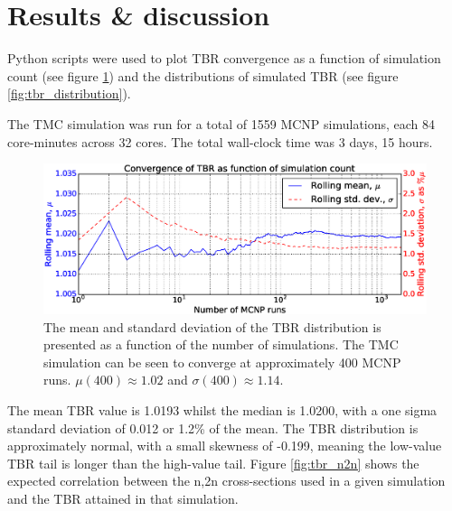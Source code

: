 \section{Results \& discussion}
Python scripts were used to plot TBR convergence as a function of simulation count (see figure \ref{fig:convergence}) and the distributions of simulated TBR (see figure \ref{fig:tbr_distribution}).

The TMC simulation was run for a total of 1559 MCNP simulations, each 84 core-minutes across 32 cores. The total wall-clock time was 3 days, 15 hours.

\begin{figure}[ht]
	\includegraphics[width=\textwidth]{hcll_convergence_1559}
	\caption{The mean and standard deviation of the TBR distribution is presented as a function of the number of simulations. The TMC simulation can be seen to converge at approximately 400 MCNP runs. $\mu(400) \approx 1.02$ and $\sigma(400) \approx 1.14$.}
	\label{fig:convergence}
\end{figure}

The mean TBR value is 1.0193 whilst the median is 1.0200, with a one sigma standard deviation of 0.012 or 1.2\% of the mean. The TBR distribution is approximately normal, with a small skewness of -0.199, meaning the low-value TBR tail is longer than the high-value tail. Figure \ref{fig:tbr_n2n} shows the expected correlation between the n,2n cross-sections used in a given simulation and the TBR attained in that simulation.

